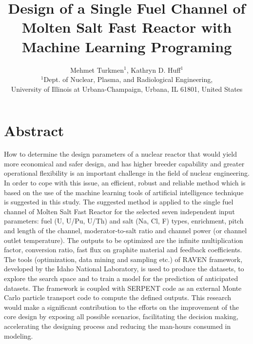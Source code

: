 \documentclass[10pt,a4paper]{article}
\begin{document}
\title{Design of a Single Fuel Channel of Molten Salt Fast Reactor with Machine Learning Programing}
\author{Mehmet Turkmen$^1$, Kathryn D. Huff$^1$\\
$^1$Dept. of Nuclear, Plasma, and Radiological Engineering, \\University of Illinois at Urbana-Champaign, Urbana, IL 61801, United States}

\maketitle


\section*{Abstract}
How to determine the design parameters of a nuclear reactor that would yield more economical and safer design, and has higher breeder capability and greater operational flexibility is an important challenge in the field of nuclear engineering. In order to cope with this issue, an efficient, robust and reliable method which is based on the use of the machine learning tools of artificial intelligence technique is suggested in this study. The suggested method is applied to the single fuel channel of Molten Salt Fast Reactor for the selected seven independent input parameters: fuel (U, U/Pu, U/Th) and salt (Na, Cl, F) types, enrichment, pitch and length of the channel, moderator-to-salt ratio and channel power (or channel outlet temperature). The outputs to be optimized are the infinite multiplication factor, conversion ratio, fast flux on graphite material and feedback coefficients. The tools (optimization, data mining and sampling etc.) of RAVEN framework, developed by the Idaho National Laboratory, is used to produce the datasets, to explore the search space and to train a model for the prediction of anticipated datasets. The framework is coupled with SERPENT code as an external Monte Carlo particle transport code to compute the defined outputs. This research would make a significant contribution to the efforts on the improvement of the core design by exposing all possible scenarios, facilitating the decision making, accelerating the designing process and reducing the man-hours consumed in modeling.
\end{document}
